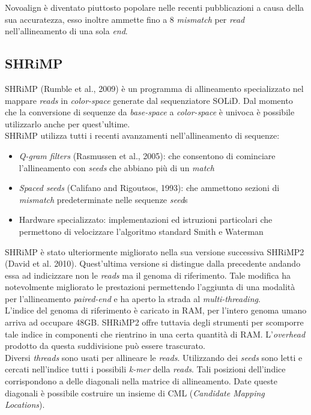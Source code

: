 \documentclass[conference]{IEEEtran}
\begin{document}
Novoalign è diventato piuttosto popolare nelle recenti pubblicazioni a causa della sua accuratezza, esso inoltre ammette fino a 8 \textit{mismatch} per \textit{read} nell'allineamento di una sola \textit{end}.

	\subsection{SHRiMP}

SHRiMP (Rumble et al., 2009) è un programma di allineamento specializzato nel mappare \textit{reads} in \textit{color-space} generate dal sequenziatore SOLiD. Dal momento che la conversione di sequenze da \textit{base-space} a \textit{color-space} è univoca è possibile utilizzarlo anche per quest'ultime.\\
SHRiMP utilizza tutti i recenti avanzamenti nell'allineamento di sequenze:
\begin{itemize}
	\item \textit{Q-gram filters} (Rasmussen et al., 2005): che consentono di cominciare l'allineamento con \textit{seeds} che abbiano più di un \textit{match}
	\item \textit{Spaced seeds} (Califano and Rigoutsos, 1993): che ammettono sezioni di \textit{mismatch} predeterminate nelle sequenze \textit{seed}s
	\item Hardware specializzato: implementazioni ed istruzioni particolari che permettono di velocizzare l'algoritmo standard Smith e Waterman\\
\end{itemize}
SHRiMP è stato ulteriormente migliorato nella sua versione successiva SHRiMP2 (David et al. 2010). Quest'ultima versione si distingue dalla precedente andando essa ad indicizzare non le \textit{reads} ma il genoma di riferimento. Tale modifica ha notevolmente migliorato le prestazioni permettendo l'aggiunta di una modalità per l'allineamento \textit{paired-end} e ha aperto la strada al \textit{multi-threading}.\\

L'indice del genoma di riferimento è caricato in RAM, per l'intero genoma umano arriva ad occupare 48GB. SHRiMP2 offre tuttavia degli strumenti per scomporre tale indice in componenti che rientrino in una certa quantità di RAM. L'\textit{overhead} prodotto da questa suddivisione può essere trascurato.\\

Diversi \textit{threads} sono usati per allineare le \textit{reads}. Utilizzando dei \textit{seeds} sono letti e cercati nell'indice tutti i possibili \textit{k-mer} della \textit{reads}. Tali posizioni dell'indice corrispondono a delle diagonali nella matrice di allineamento. Date queste diagonali è possibile costruire un insieme di CML (\textit{Candidate Mapping Locations}).\\
\end{document}
